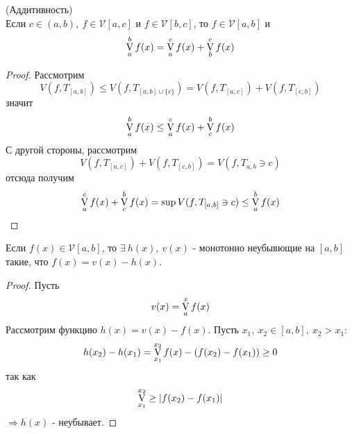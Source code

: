 \begin{numtheorem} (Аддитивность)\\
    Если $c\in (a,b),\ f\in \mathcal{V}[a,c]$ и $f\in \mathcal{V}[b,c]$, то $f\in \mathcal{V}[a,b]$ и 
    \[\operatorname*{V}\limits_{a}^{b}f(x)=\operatorname*{V}\limits_{a}^{c}f(x)+\operatorname*{V}\limits_{b}^{c}f(x)\]
\end{numtheorem} 
\begin{proof}
    Рассмотрим 
    \[V(f,T_{[a,b]})\leq V(f, T_{[a,b]\cup \{c\}})=V(f, T_{[a,c]})+V(f,T_{[c,b]})\]
    значит
    \[\operatorname*{V}\limits_{a}^{b} f(x)\leq \operatorname*{V}\limits_{a}^{c} f(x)+\operatorname*{V}\limits_{c}^{b} f(x)\]
    С другой стороны, рассмотрим 
    \[V(f, T_{[a,c]})+V(f, T_{[c,b]})=V(f, T_{a,b}\ni c)\]
    отсюда получим
    \[\operatorname*{V}\limits_{a}^{c}f(x)+\operatorname*{V}\limits_{c}^{b}f(x)=\sup V(f,T_{[a,b]}\ni c)\leq \operatorname*{V}\limits_{a}^{b} f(x)\] 
\end{proof} 
\setcounter{thmcount}{0}
\begin{theorem}
    Если $f(x)\in \mathcal{V}[a,b]$, то $\exists\ h(x),\ v(x)$ - монотонно неубывющие на $[a,b]$ такие, что $f(x)=v(x)-h(x)$.
\end{theorem} 
\begin{proof}
    Пусть
    \[v(x)=\operatorname*{V}\limits_{a}^{x} f(x)\]
    Рассмотрим функцию $h(x)=v(x)-f(x)$. Пусть $x_1,\ x_2\in [a,b],\ x_2>x_1$:
    \[h(x_2)-h(x_1)=\operatorname*{V}\limits_{x_1}^{x_2}f(x)-(f(x_2)-f(x_1))\geq 0\]
    так как 
    \[\operatorname*{V}\limits_{x_1}^{x_2}\geq|f(x_2)-f(x_1)|\]
    $\Rightarrow h(x)$ - неубывает.
\end{proof} 
